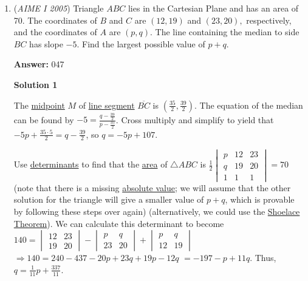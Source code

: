 \begin{enumerate}
 


	\item (\textit{AIME I 2005}) Triangle $ABC$ lies in the Cartesian Plane and has an area of 70. The coordinates of $B$ and $C$ are $(12,19)$ and $(23,20),$ respectively, and the coordinates of $A$ are $(p,q).$ The line containing the median to side $BC$ has slope $-5.$ Find the largest possible value of $p+q.$

 \textbf{Answer: }047



\textbf{Solution 1}

The \href{https://artofproblemsolving.com/wiki/index.php?title=Midpoint}{midpoint} $M$ of \href{https://artofproblemsolving.com/wiki/index.php?title=Line\_segment}{line segment} $\overline{BC}$ is $\left(\frac{35}{2}, \frac{39}{2}\right)$. The equation of the median can be found by $-5 = \frac{q - \frac{39}{2}}{p - \frac{35}{2}}$. Cross multiply and simplify to yield that $-5p + \frac{35 \cdot 5}{2} = q - \frac{39}{2}$, so $q = -5p + 107$.

 Use \href{https://artofproblemsolving.com/wiki/index.php?title=Determinant}{determinants} to find that the \href{https://artofproblemsolving.com/wiki/index.php?title=Area}{area} of $\triangle ABC$ is $\frac{1}{2} \begin{vmatrix}p & 12 & 23 \\  q & 19 & 20 \\ 1 & 1 & 1\end{vmatrix} = 70$ (note that there is a missing \href{https://artofproblemsolving.com/wiki/index.php?title=Absolute\_value}{absolute value}; we will assume that the other solution for the triangle will give a smaller value of $p+q$, which is provable by following these steps over again) (alternatively, we could use the \href{https://artofproblemsolving.com/wiki/index.php?title=Shoelace\_Theorem}{Shoelace Theorem}). We can calculate this determinant to become $140 = \begin{vmatrix} 12 & 23 \\ 19 & 20 \end{vmatrix} - \begin{vmatrix} p & q \\ 23 & 20 \end{vmatrix} + \begin{vmatrix} p & q \\ 12 & 19 \end{vmatrix}$ $\Longrightarrow 140 = 240 - 437 - 20p + 23q + 19p - 12q$ $= -197 - p + 11q$. Thus, $q = \frac{1}{11}p + \frac{337}{11}$.


\end{enumerate}
